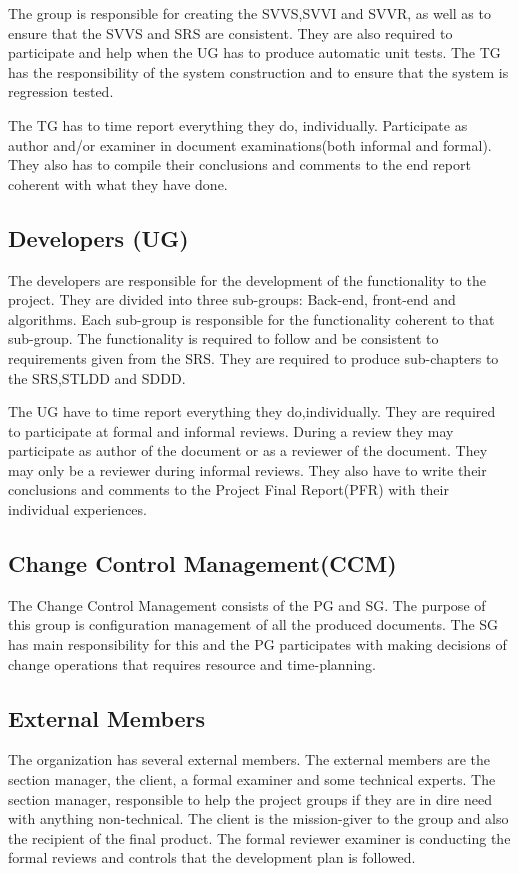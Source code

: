 \documentclass{article}
\begin{document}
The group is responsible for creating the SVVS,SVVI and SVVR, as well as to ensure that the SVVS and SRS are consistent. They are also required to participate and help when the UG has to produce automatic unit tests. The TG has the responsibility of the system construction and to ensure that the system is regression tested. 

The TG has to time report everything they do, individually. Participate as author and/or examiner in document examinations(both informal and formal). They also has to compile their conclusions and comments to the end report coherent with what they have done.  

\subsection{Developers (UG)}
The developers are responsible for the development of the functionality to the project. They are divided into three sub-groups: Back-end, front-end and algorithms. Each sub-group is responsible for the functionality coherent to that sub-group. The functionality is required to follow and be consistent to requirements given from the SRS. They are required to produce sub-chapters to the SRS,STLDD and SDDD.

The UG have to time report everything they do,individually. They are required to participate at formal and informal reviews. During a review they may participate as author of the document or as a reviewer of the document. They may only be a reviewer during informal reviews. They also have to write their conclusions and comments to the Project Final Report(PFR) with their individual experiences.

\subsection{Change Control Management(CCM)}
The Change Control Management consists of the PG and SG. The purpose of this group is configuration management of all the produced documents. The SG has main responsibility for this and the PG participates with making decisions of change operations that requires resource and time-planning. 

\subsection{External Members}
The organization has several external members. The external members are the section manager, the client, a formal examiner and some technical experts. The section manager, responsible to help the project groups if they are in dire need with anything non-technical. The client is the mission-giver to the group and also the recipient of the final product. The formal reviewer examiner is conducting the formal reviews and controls that the development plan is followed. 
\end{document}
